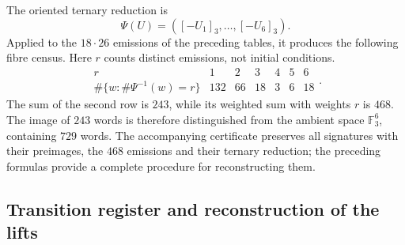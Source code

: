The oriented ternary reduction is
\[
 \Psi(U)=([-U_1]_3,\ldots,[-U_6]_3).
\]
Applied to the $18\cdot26$ emissions of the preceding tables,
it produces the following fibre census. Here $r$ counts distinct
emissions, not initial conditions.
\begin{equation}
 \begin{array}{c|rrrrrr}
 r&1&2&3&4&5&6\\ \hline
 \#\{w:\#\Psi^{-1}(w)=r\}&132&66&18&3&6&18
 \end{array}.
 \label{iii:iii:nf-censo-ternario}
\end{equation}
The sum of the second row is $243$, while its weighted sum
with weights $r$ is $468$. The image of $243$ words is therefore distinguished
from the ambient space $\mathbb F_3^6$, containing $729$ words. The accompanying
certificate preserves all signatures with their preimages, the $468$
emissions and their ternary reduction; the preceding formulas provide
a complete procedure for reconstructing them.

\subsection{Transition register and reconstruction of the lifts}

